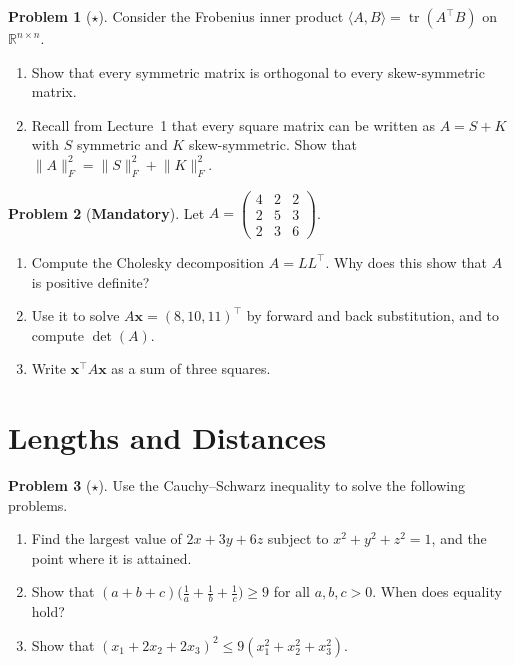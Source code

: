 \documentclass[11pt]{article}
\theoremstyle{definition}
\newtheorem{problem}{Problem}[section]
\newcommand{\mandatory}{\textcolor{red!70!black}{\textbf{Mandatory}}}
\newcommand{\norm}[1]{\lVert #1 \rVert}
\newcommand{\ip}[2]{\langle #1, #2 \rangle}
\DeclareMathOperator{\tr}{tr}
\begin{document}
\begin{problem}[$\star$]\label{pr:frobenius-ip}
    Consider the Frobenius inner product $\ip{A}{B} = \tr(A^\top B)$ on $\mathbb{R}^{n \times n}$.
    \begin{enumerate}[label=(\alph*)]
        \item Show that every symmetric matrix is orthogonal to every skew-symmetric matrix.
        \item Recall from Lecture~1 that every square matrix can be written as $A = S + K$ with $S$ symmetric and $K$ skew-symmetric. Show that $\norm{A}_F^2 = \norm{S}_F^2 + \norm{K}_F^2$.
    \end{enumerate}
\end{problem}

\begin{problem}[\mandatory]\label{pr:cholesky}
    Let $A = \begin{pmatrix} 4 & 2 & 2 \\ 2 & 5 & 3 \\ 2 & 3 & 6 \end{pmatrix}$.
    \begin{enumerate}[label=(\alph*)]
        \item Compute the Cholesky decomposition $A = LL^\top$. Why does this show that $A$ is positive definite?
        \item Use it to solve $A\mathbf{x} = (8, 10, 11)^\top$ by forward and back substitution, and to compute $\det(A)$.
        \item Write $\mathbf{x}^\top A\mathbf{x}$ as a sum of three squares.
    \end{enumerate}
\end{problem}

\section{Lengths and Distances}

\begin{problem}[$\star$]\label{pr:cs-apps}
    Use the Cauchy--Schwarz inequality to solve the following problems.
    \begin{enumerate}[label=(\alph*)]
        \item Find the largest value of $2x + 3y + 6z$ subject to $x^2 + y^2 + z^2 = 1$, and the point where it is attained.
        \item Show that $(a + b + c)\big(\frac{1}{a} + \frac{1}{b} + \frac{1}{c}\big) \geq 9$ for all $a, b, c > 0$. When does equality hold?
        \item Show that $(x_1 + 2x_2 + 2x_3)^2 \leq 9(x_1^2 + x_2^2 + x_3^2)$.
    \end{enumerate}
\end{problem}
\end{document}
